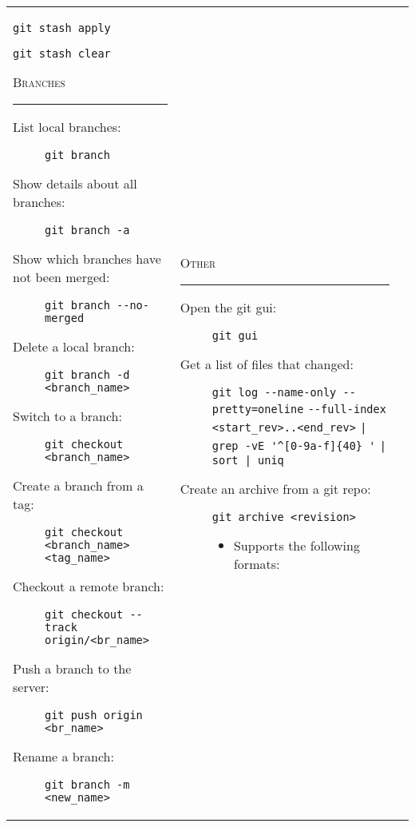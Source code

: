 \documentclass[landscape]{article}
\begin{document}
\begin{tabular*}{10.5in}{|p{2.9in}|p{2.9in}|p{2.9in}|}
\begin{flushleft}
\begin{description}
                {\verb!git stash apply!}
            \item[Clear the stash:]
                {\verb!git stash clear!}
        \end{description}
        \textsc{Branches}
        \rule{2.9in}{.5pt}
        \small
        \begin{description}
            \item[List local branches:]
                {\verb!git branch!}
            \item[Show details about all branches:]
                {\verb!git branch -a!}
            \item[Show which branches have not been merged:]
                {\verb!git branch --no-merged!}
            \item[Delete a local branch:]
                {\verb!git branch -d <branch_name>!}
            \item[Switch to a branch:]
                {\verb!git checkout <branch_name>!}
            \item[Create a branch from a tag:]
                {\verb!git checkout <branch_name> <tag_name>!}
            \item[Checkout a remote branch:]
                {\verb!git checkout --track origin/<br_name>!}
            \item[Push a branch to the server:]
                {\verb!git push origin <br_name>!}
            \item[Rename a branch:]
                {\verb!git branch -m <new_name>!}
        \end{description}
    \end{flushleft}
    &
    \begin{flushleft}
        \textsc{Other}
        \rule{2.9in}{.5pt}
        \small
        \begin{description}
            \item[Open the git gui:]
                {\verb!git gui!}
            \item[Get a list of files that changed:]
                {\verb!git log --name-only --pretty=oneline!
                 \verb!--full-index <start_rev>..<end_rev>!
                 \verb!| grep -vE '^[0-9a-f]{40} '!
                 \verb!| sort | uniq!}
             \item[Create an archive from a git repo:]
                 {\verb!git archive <revision>!}
                 \begin{itemize}
                     \item{Supports the following formats:}

\end{itemize}
\end{description}
\end{flushleft}
\end{tabular*}
\end{document}
